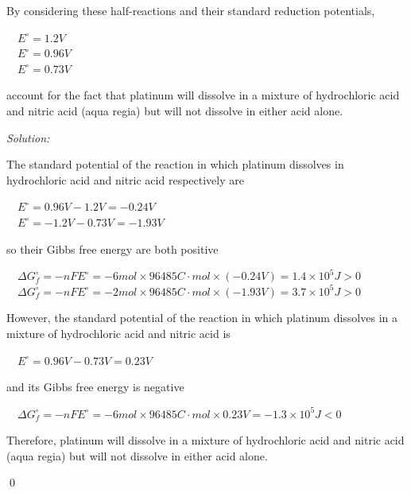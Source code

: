 \documentclass[12pt]{article}
\newenvironment{problem}[2][Problem]{\begin{trivlist}
\item[\hskip \labelsep {\bfseries #1}\hskip \labelsep {\bfseries #2.}]}{\end{trivlist}}
\newenvironment{sol}
    {\emph{Solution:}
    }
    {
    \qed
    }
\begin{document}
\begin{problem}{17.84}
By considering these half-reactions and their standard reduction potentials,
\begin{center}
~~$E^{\circ}=1.2V$\\
~~$E^{\circ}=0.96V$\\
~~$E^{\circ}=0.73V$
\end{center}
account for the fact that platinum will dissolve in a mixture of hydrochloric acid and nitric acid (aqua regia) but will not dissolve in either acid alone.
\end{problem}
\begin{sol}
The standard potential of the reaction in which platinum dissolves in hydrochloric acid and nitric acid respectively are
\begin{center}
~~$E^{\circ}=0.96V-1.2V=-0.24V$\\
~~$E^{\circ}=-1.2V-0.73V=-1.93V$
\end{center}
so their Gibbs free energy are both positive
\begin{center}
~~$\Delta G_f^{\circ}=-nFE^{\circ}=-6mol\times96485C\cdot mol\times(-0.24V)=1.4\times10^5J>0$\\
~~$\Delta G_f^{\circ}=-nFE^{\circ}=-2mol\times96485C\cdot mol\times(-1.93V)=3.7\times10^5J>0$
\end{center}
However, the standard potential of the reaction in which platinum dissolves in a mixture of hydrochloric acid and nitric acid is
\begin{center}
~~$E^{\circ}=0.96V-0.73V=0.23V$
\end{center}
and its Gibbs free energy is negative
\begin{center}
~~$\Delta G_f^{\circ}=-nFE^{\circ}=-6mol\times96485C\cdot mol\times0.23V=-1.3\times10^5J<0$
\end{center}
Therefore, platinum will dissolve in a mixture of hydrochloric acid and nitric acid (aqua regia) but will not dissolve in either acid alone.
\end{sol}
\end{document}
